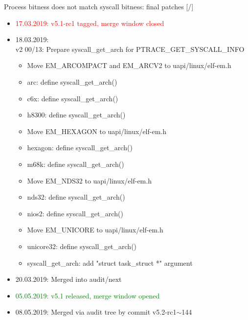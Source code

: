 \documentclass[unicode,aspectratio=169]{beamer}
\begin{document}
\begin{frame}{Process bitness does not match syscall bitness: final patches \hfill [\insertframenumber/\inserttotalframenumber]}
\large
\begin{itemize}
	\item \textcolor{red}{17.03.2019: v5.1-rc1 tagged, merge window closed}
	\item 18.03.2019: \\ v2 00/13: Prepare syscall\_get\_arch for PTRACE\_GET\_SYSCALL\_INFO
	\begin{itemize}
		\scriptsize
		\item Move EM\_ARCOMPACT and EM\_ARCV2 to uapi/linux/elf-em.h
		\item arc: define syscall\_get\_arch()
		\item c6x: define syscall\_get\_arch()
		\item h8300: define syscall\_get\_arch()
		\item Move EM\_HEXAGON to uapi/linux/elf-em.h
		\item hexagon: define syscall\_get\_arch()
		\item m68k: define syscall\_get\_arch()
		\item Move EM\_NDS32 to uapi/linux/elf-em.h
		\item nds32: define syscall\_get\_arch()
		\item nios2: define syscall\_get\_arch()
		\item Move EM\_UNICORE to uapi/linux/elf-em.h
		\item unicore32: define syscall\_get\_arch()
		\item syscall\_get\_arch: add "struct task\_struct *" argument
	\end{itemize}
	\item 20.03.2019: Merged into audit/next
	\item \textcolor{green}{05.05.2019: v5.1 released, merge window opened}
	\item 08.05.2019: Merged via audit tree by commit v5.2-rc1$\sim$144
\end{itemize}
\end{frame}
\end{document}
